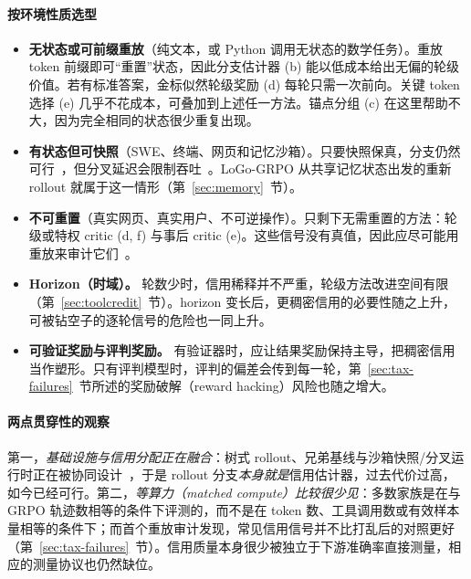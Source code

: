 \paragraph{按环境性质选型}
\begin{itemize}
  \item \textbf{无状态或可前缀重放}（纯文本，或 Python 调用无状态的数学任务）。重放 token 前缀即可“重置”状态，因此分支估计器 (b) 能以低成本给出无偏的轮级价值。若有标准答案，金标似然轮级奖励 (d) 每轮只需一次前向。关键 token 选择 (e) 几乎不花成本，可叠加到上述任一方法。锚点分组 (c) 在这里帮助不大，因为完全相同的状态很少重复出现。
  \item \textbf{有状态但可快照}（SWE、终端、网页和记忆沙箱）。只要快照保真，分支仍然可行~\citep{bpo2026branching}，但分叉延迟会限制吞吐~\citep{deltabox2026}。LoGo-GRPO 从共享记忆状态出发的重新 rollout 就属于这一情形（第~\ref{sec:memory}~节）。
  \item \textbf{不可重置}（真实网页、真实用户、不可逆操作）。只剩下无需重置的方法：轮级或特权 critic (d, f) 与事后 critic (e)。这些信号没有真值，因此应尽可能用重放来审计它们~\citep{zhang2026credit}。
  \item \textbf{Horizon（时域）。} 轮数少时，信用稀释并不严重，轮级方法改进空间有限（第~\ref{sec:toolcredit}~节）。horizon 变长后，更稠密信用的必要性随之上升，可被钻空子的逐轮信号的危险也一同上升。
  \item \textbf{可验证奖励与评判奖励。} 有验证器时，应让结果奖励保持主导，把稠密信用当作塑形。只有评判模型时，评判的偏差会传到每一轮，第~\ref{sec:tax-failures}~节所述的奖励破解（reward hacking）风险也随之增大。
\end{itemize}

\paragraph{两点贯穿性的观察}
第一，\emph{基础设施与信用分配正在融合}：树式 rollout、兄弟基线与沙箱快照/分叉运行时正在被协同设计~\citep{ji2025tree,bpo2026branching,deltabox2026,crab2026}，于是 rollout 分支\emph{本身就是}信用估计器，过去代价过高，如今已经可行。第二，\emph{等算力（matched compute）比较很少见}：多数家族是在与 GRPO 轨迹数相等的条件下评测的，而不是在 token 数、工具调用数或有效样本量相等的条件下；而首个重放审计发现，常见信用信号并不比打乱后的对照更好（第~\ref{sec:tax-failures}~节）。信用质量本身很少被独立于下游准确率直接测量，相应的测量协议也仍然缺位。
